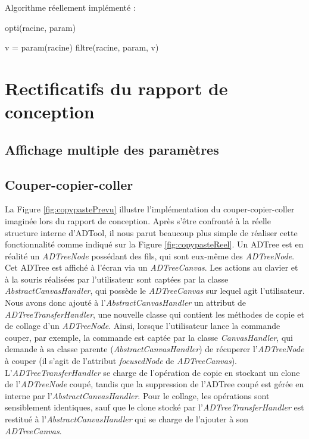 Algorithme réellement implémenté :

	\begin{algorithm}[h!]
            \caption{opti(racine, param)}
            \label{algo:optireal}
            \begin{algorithmic}
		\STATE v = param(racine)
		\STATE filtre(racine, param, v)
            \end{algorithmic}
        \end{algorithm}

\newpage
\section{Rectificatifs du rapport de conception}
\label{sec:rectConc}


	\subsection{Affichage multiple des paramètres}

	\subsection{Couper-copier-coller}
	La {\sc Figure} \ref{fig:copypastePrevu} illustre l'implémentation du couper-copier-coller imaginée lors du rapport de conception. Après s'être confronté à la réelle structure interne d'ADTool, il nous parut beaucoup plus simple de réaliser cette fonctionnalité comme indiqué sur la {\sc Figure} \ref{fig:copypasteReel}. Un ADTree est en réalité un \emph{ADTreeNode} possédant des fils, qui sont eux-même des \emph{ADTreeNode}. Cet ADTree est affiché à l'écran via un \emph{ADTreeCanvas}. Les actions au clavier et à la souris réalisées par l'utilisateur sont captées par la classe \emph{AbstractCanvasHandler}, qui possède le \emph{ADTreeCanvas} sur lequel agit l'utilisateur. Nous avons donc ajouté à l'\emph{AbstractCanvasHandler} un attribut de \emph{ADTreeTransferHandler}, une nouvelle classe qui contient les méthodes de copie et de collage d'un \emph{ADTreeNode}. Ainsi, lorsque l'utilisateur lance la commande couper, par exemple, la commande est captée par la classe \emph{CanvasHandler}, qui demande à sa classe parente (\emph{AbstractCanvasHandler}) de récuperer l'\emph{ADTreeNode} à couper (il s'agit de l'attribut \emph{focusedNode} de \emph{ADTreeCanvas}). L'\emph{ADTreeTransferHandler} se charge de l'opération de copie en stockant un clone de l'\emph{ADTreeNode} coupé, tandis que la suppression de l'ADTree coupé est gérée en interne par l'\emph{AbstractCanvasHandler}. Pour le collage, les opérations sont sensiblement identiques, sauf que le clone stocké par l'\emph{ADTreeTransferHandler} est restitué à l'\emph{AbstractCanvasHandler} qui se charge de l'ajouter à son \emph{ADTreeCanvas}.
	
